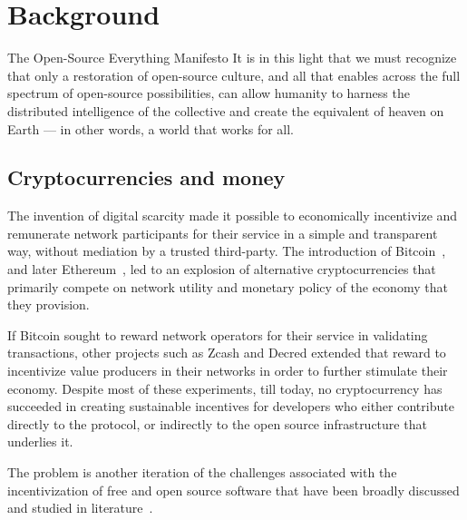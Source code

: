 \section{Background}

\begin{epigraph}{The Open-Source Everything Manifesto}
    \noindent It is in this light that we must recognize that only a restoration of
    open-source culture, and all that enables across the full spectrum of
    open-source possibilities, can allow humanity to harness the distributed
    intelligence of the collective and create the equivalent of heaven on Earth
    --- in other words, a world that works for all.
\end{epigraph}

\subsection{Cryptocurrencies and money}

The invention of digital scarcity made it possible to economically incentivize
and remunerate network participants for their service in a simple and
transparent way, without mediation by a trusted third-party. The introduction
of Bitcoin~\cite{bitcoin}, and later Ethereum~\cite{ethereum}, led to an
explosion of alternative cryptocurrencies that primarily compete on network
utility and monetary policy of the economy that they provision.


If Bitcoin sought to reward network operators for their service in validating
transactions, other projects such as Zcash and Decred extended that reward to
incentivize value producers in their networks in order to further stimulate
their economy. Despite most of these experiments, till today, no cryptocurrency
has succeeded in creating sustainable incentives for developers who either
contribute directly to the protocol, or indirectly to the open source
infrastructure that underlies it.

The problem is another iteration of the challenges associated with the
incentivization of free and open source software that have been broadly
discussed and studied in literature~\cite{roads and bridges}.

